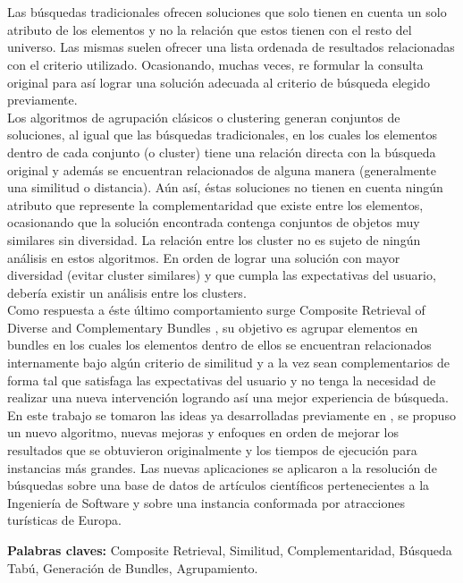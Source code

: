 \chapter*{\runtitulo}

\noindent Las búsquedas tradicionales ofrecen soluciones que solo tienen en cuenta un solo atributo de los elementos y no la relación que estos tienen con el resto del universo. Las mismas suelen ofrecer una lista ordenada de resultados relacionadas con
el criterio utilizado. Ocasionando, muchas veces, re formular la consulta original para así lograr una solución adecuada al criterio de búsqueda elegido previamente.\\
Los algoritmos de agrupación clásicos o clustering generan conjuntos de soluciones, al igual que las búsquedas tradicionales, en los cuales los elementos dentro de cada conjunto (o cluster) tiene una relación directa con la búsqueda original y además se encuentran relacionados de alguna manera (generalmente una similitud o distancia). Aún así, éstas soluciones no tienen en cuenta ningún atributo que represente la complementaridad que existe entre los elementos, ocasionando que la solución encontrada contenga conjuntos de objetos muy similares sin diversidad. La relación entre los cluster no es sujeto de ningún análisis en estos algoritmos. En orden de lograr una solución con mayor diversidad (evitar cluster similares) y que cumpla las expectativas del usuario, debería existir un análisis entre los clusters.\\
Como respuesta a éste último comportamiento surge Composite Retrieval of Diverse and Complementary Bundles \cite{compositeRetrival}, su objetivo es agrupar elementos en bundles en los cuales los elementos dentro de ellos se encuentran relacionados internamente bajo algún criterio de similitud y a la vez sean complementarios de forma tal que satisfaga las expectativas del usuario y no tenga la necesidad de realizar una nueva intervención logrando así una mejor experiencia de búsqueda.\\
En este trabajo se tomaron las ideas ya desarrolladas previamente en \cite{compositeRetrival}, se propuso un nuevo algoritmo, nuevas mejoras y enfoques en orden de mejorar los resultados que se obtuvieron originalmente y los tiempos de ejecución para instancias más grandes. Las nuevas aplicaciones se aplicaron a la resolución de búsquedas sobre una base de datos de artículos científicos pertenecientes a la Ingeniería de Software \cite{dataDrive} y sobre una instancia conformada por atracciones turísticas de Europa.

\bigskip

\noindent\textbf{Palabras claves:} Composite Retrieval, Similitud, Complementaridad, Búsqueda Tabú, Generación de Bundles, Agrupamiento.
